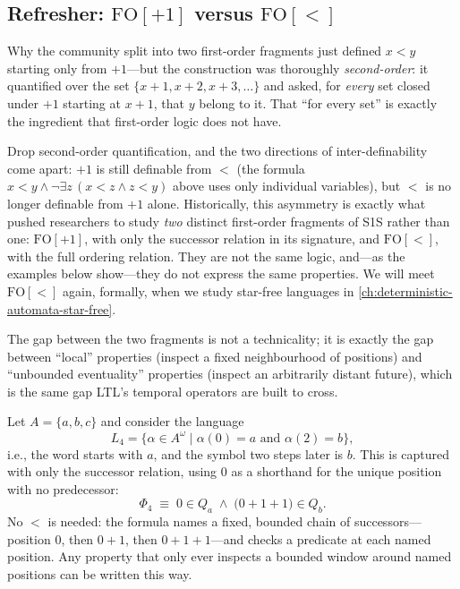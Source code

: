 \subsection{Refresher: \texorpdfstring{$\text{FO}[+1]$}{FO[+1]} versus \texorpdfstring{$\text{FO}[<]$}{FO[<]}}
\label{subsec:fo-plus1-vs-fo-order}

\begin{intermezzo}{Why the community split into two first-order fragments}
 just defined $x < y$ starting only from $+1$---but
the construction was thoroughly \emph{second-order}: it quantified over
the set $\{x+1, x+2, x+3, \ldots\}$ and asked, for \emph{every} set
closed under $+1$ starting at $x+1$, that $y$ belong to it. That ``for
every set'' is exactly the ingredient that first-order logic does not
have.

Drop second-order quantification, and the two directions of
inter-definability come apart: $+1$ is still definable from $<$ (the
formula $x < y \land \neg\exists z\,(x < z \land z < y)$ above uses only
individual variables), but $<$ is no longer definable from $+1$ alone.
Historically, this asymmetry is exactly what pushed researchers to study
\emph{two} distinct first-order fragments of S1S rather than one:
$\text{FO}[+1]$, with only the successor relation in its signature, and
$\text{FO}[<]$, with the full ordering relation. They are not the same
logic, and---as the examples below show---they do not express the same
properties. We will meet $\text{FO}[<]$ again, formally, when we study
star-free languages in \cref{ch:deterministic-automata-star-free}.
\end{intermezzo}

The gap between the two fragments is not a technicality; it is exactly
the gap between ``local'' properties (inspect a fixed neighbourhood of
positions) and ``unbounded eventuality'' properties (inspect an
arbitrarily distant future), which is the same gap LTL's temporal
operators are built to cross.

\begin{example}
\label{ex:fo-plus1-can}
Let $A = \{a, b, c\}$ and consider the language
\[
  L_4 = \{\alpha \in A^\omega \mid \alpha(0) = a \text{ and } \alpha(2) = b\},
\]
i.e., the word starts with $a$, and the symbol two steps later is $b$.
This is captured with only the successor relation, using $0$ as a
shorthand for the unique position with no predecessor:
\[
  \Phi_4 \;\equiv\; 0 \in Q_a \;\land\; \bigl(0+1+1\bigr) \in Q_b.
\]
No $<$ is needed: the formula names a fixed, bounded chain of
successors---position $0$, then $0+1$, then $0+1+1$---and checks a
predicate at each named position. Any property that only ever inspects
a bounded window around named positions can be written this way.
\end{example}

